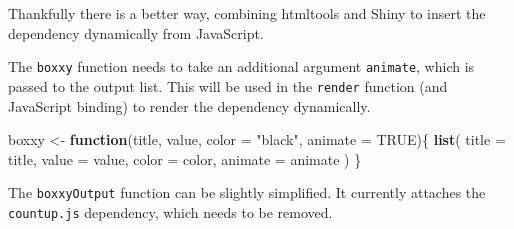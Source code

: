\documentclass[10pt,]{krantz}
\makeatletter
\newenvironment{Shaded}{\begin{snugshade}}{\end{snugshade}}
\newcommand{\CommentTok}[1]{\textcolor[rgb]{0.37,0.37,0.37}{\textit{#1}}}
\newcommand{\ControlFlowTok}[1]{\textcolor[rgb]{0.27,0.27,0.27}{\textbf{#1}}}
\newcommand{\DataTypeTok}[1]{\textcolor[rgb]{0.27,0.27,0.27}{#1}}
\newcommand{\KeywordTok}[1]{\textcolor[rgb]{0.27,0.27,0.27}{\textbf{#1}}}
\newcommand{\NormalTok}[1]{#1}
\newcommand{\OperatorTok}[1]{\textcolor[rgb]{0.43,0.43,0.43}{\textbf{#1}}}
\newcommand{\OtherTok}[1]{\textcolor[rgb]{0.37,0.37,0.37}{#1}}
\newcommand{\StringTok}[1]{\textcolor[rgb]{0.5,0.5,0.5}{#1}}
\newenvironment{kframe}{%
\medskip{}
\setlength{\fboxsep}{.8em}
 \def\at@end@of@kframe{}%
 \ifinner\ifhmode%
  \def\at@end@of@kframe{\end{minipage}}%
  \begin{minipage}{\columnwidth}%
 \fi\fi%
 \def\FrameCommand##1{\hskip\@totalleftmargin \hskip-\fboxsep
 \colorbox{shadecolor}{##1}\hskip-\fboxsep
     \hskip-\linewidth \hskip-\@totalleftmargin \hskip\columnwidth}%
 \MakeFramed {\advance\hsize-\width
   \@totalleftmargin\z@ \linewidth\hsize
   \@setminipage}}%
 {\par\unskip\endMakeFramed%
 \at@end@of@kframe}
\renewenvironment{Shaded}{\begin{kframe}}{\end{kframe}}
\makeatother
\begin{document}
Thankfully there is a better way, combining htmltools and Shiny to insert the dependency dynamically from JavaScript.

The \texttt{boxxy} function needs to take an additional argument \texttt{animate}, which is passed to the output list. This will be used in the \texttt{render} function (and JavaScript binding) to render the dependency dynamically.

\begin{Shaded}
\begin{Highlighting}[]
\NormalTok{boxxy <-}\StringTok{ }\ControlFlowTok{function}\NormalTok{(title, value, }\DataTypeTok{color =} \StringTok{"black"}\NormalTok{, }\DataTypeTok{animate =} \OtherTok{TRUE}\NormalTok{)\{}
  \KeywordTok{list}\NormalTok{(}
    \DataTypeTok{title =}\NormalTok{ title, }\DataTypeTok{value =}\NormalTok{ value, }\DataTypeTok{color =}\NormalTok{ color, }\DataTypeTok{animate =}\NormalTok{ animate}
\NormalTok{  )}
\NormalTok{\}}
\end{Highlighting}
\end{Shaded}

The \texttt{boxxyOutput} function can be slightly simplified. It currently attaches the \texttt{countup.js} dependency, which needs to be removed.

\begin{Shaded}
\end{Shaded}
\end{document}
